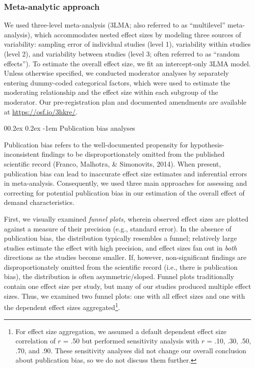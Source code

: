 \documentclass[
  man,floatsintext]{apa6}
\makeatletter
\let\oldparagraph\paragraph
\renewcommand{\paragraph}[1]{\oldparagraph{#1}\mbox{}}
\renewcommand{\paragraph}{\@startsection{paragraph}{4}{\parindent}%
  {0\baselineskip \@plus 0.2ex \@minus 0.2ex}%
  {-1em}%
  {\normalfont\normalsize\bfseries\itshape\typesectitle}}
\makeatother
\begin{document}
\hypertarget{meta-analytic-approach}{%
\subsubsection{Meta-analytic approach}\label{meta-analytic-approach}}

We used three-level meta-analysis (3LMA; also referred to as ``multilevel'' meta-analysis), which accommodates nested effect sizes by modeling three sources of variability: sampling error of individual studies (level 1), variability within studies (level 2), and variability between studies (level 3; often referred to as ``random effects''). To estimate the overall effect size, we fit an intercept-only 3LMA model. Unless otherwise specified, we conducted moderator analyses by separately entering dummy-coded categorical factors, which were used to estimate the moderating relationship and the effect size within each subgroup of the moderator. Our pre-registration plan and documented amendments are available at \url{https://osf.io/3hkre/}.

\hypertarget{publication-bias-analyses}{%
\paragraph{Publication bias analyses}\label{publication-bias-analyses}}

Publication bias refers to the well-documented propensity for hypothesis-inconsistent findings to be disproportionately omitted from the published scientific record (Franco, Malhotra, \& Simonovits, 2014). When present, publication bias can lead to inaccurate effect size estimates and inferential errors in meta-analysis. Consequently, we used three main approaches for assessing and correcting for potential publication bias in our estimation of the overall effect of demand characteristics.

First, we visually examined \emph{funnel plots,} wherein observed effect sizes are plotted against a measure of their precision (e.g., standard error). In the absence of publication bias, the distribution typically resembles a funnel; relatively large studies estimate the effect with high precision, and effect sizes fan out in \emph{both} directions as the studies become smaller. If, however, non-significant findings are disproportionately omitted from the scientific record (i.e., there is publication bias), the distribution is often asymmetric/sloped. Funnel plots traditionally contain one effect size per study, but many of our studies produced multiple effect sizes. Thus, we examined two funnel plots: one with all effect sizes and one with the dependent effect sizes aggregated\footnote{For effect size aggregation, we assumed a default dependent effect size correlation of \(r\) = .50 but performed sensitivity analysis with \(r\) = .10, .30, .50, .70, and .90. These sensitivity analyses did not change our overall conclusion about publication bias, so we do not discuss them further.}.
\end{document}
